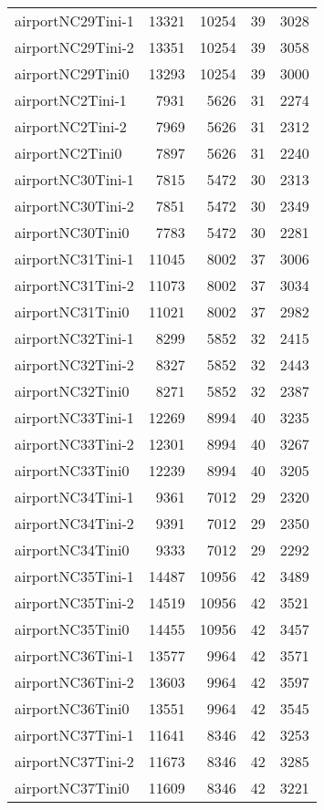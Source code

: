 \begin{tabular}{lrrrr}
airportNC29Tini-1 & 13321 & 10254 & 39 & 3028 \\
airportNC29Tini-2 & 13351 & 10254 & 39 & 3058 \\
airportNC29Tini0 & 13293 & 10254 & 39 & 3000 \\
airportNC2Tini-1 & 7931 & 5626 & 31 & 2274 \\
airportNC2Tini-2 & 7969 & 5626 & 31 & 2312 \\
airportNC2Tini0 & 7897 & 5626 & 31 & 2240 \\
airportNC30Tini-1 & 7815 & 5472 & 30 & 2313 \\
airportNC30Tini-2 & 7851 & 5472 & 30 & 2349 \\
airportNC30Tini0 & 7783 & 5472 & 30 & 2281 \\
airportNC31Tini-1 & 11045 & 8002 & 37 & 3006 \\
airportNC31Tini-2 & 11073 & 8002 & 37 & 3034 \\
airportNC31Tini0 & 11021 & 8002 & 37 & 2982 \\
airportNC32Tini-1 & 8299 & 5852 & 32 & 2415 \\
airportNC32Tini-2 & 8327 & 5852 & 32 & 2443 \\
airportNC32Tini0 & 8271 & 5852 & 32 & 2387 \\
airportNC33Tini-1 & 12269 & 8994 & 40 & 3235 \\
airportNC33Tini-2 & 12301 & 8994 & 40 & 3267 \\
airportNC33Tini0 & 12239 & 8994 & 40 & 3205 \\
airportNC34Tini-1 & 9361 & 7012 & 29 & 2320 \\
airportNC34Tini-2 & 9391 & 7012 & 29 & 2350 \\
airportNC34Tini0 & 9333 & 7012 & 29 & 2292 \\
airportNC35Tini-1 & 14487 & 10956 & 42 & 3489 \\
airportNC35Tini-2 & 14519 & 10956 & 42 & 3521 \\
airportNC35Tini0 & 14455 & 10956 & 42 & 3457 \\
airportNC36Tini-1 & 13577 & 9964 & 42 & 3571 \\
airportNC36Tini-2 & 13603 & 9964 & 42 & 3597 \\
airportNC36Tini0 & 13551 & 9964 & 42 & 3545 \\
airportNC37Tini-1 & 11641 & 8346 & 42 & 3253 \\
airportNC37Tini-2 & 11673 & 8346 & 42 & 3285 \\
airportNC37Tini0 & 11609 & 8346 & 42 & 3221 \\

\end{tabular}
